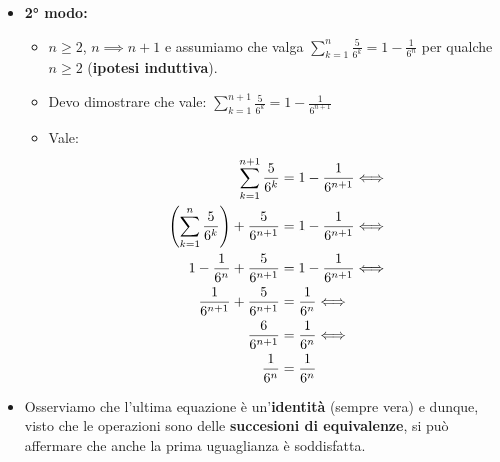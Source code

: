 \documentclass[10pt]{article}
\begin{document}
\begin{itemize}
	\item
	\textbf{2° modo:}
	\begin{itemize}
	\item
	$n \!\geq\! 2$, $n \implies n+1$ e assumiamo che valga $\displaystyle{\sum_{k=1}^{n} \frac{5}{6^k} = 1 - \frac{1}{6^{n}}}$ per qualche $n \geq 2$ (\textbf{ipotesi induttiva}).
	\item
	Devo dimostrare che vale: $\displaystyle{\sum_{k=1}^{n+1} \frac{5}{6^k} = 1 - \frac{1}{6^{n+1}}}$
	\item
	Vale:
	\begin{equation}
	\begin{split}
	\sum_{k=1}^{n+1} \frac{5}{6^k} &= 1 - \frac{1}{6^{n+1}}\Longleftrightarrow \\
	  \left(\sum_{k=1}^{n} \frac{5}{6^k}\right) + \frac{5}{6^{n+1}} &= 1 - \frac{1}{6^{n+1}}\Longleftrightarrow \\
	 1 - \frac{1}{6^n} + \frac{5}{6^{n+1}} &= 1 - \frac{1}{6^{n+1}}\Longleftrightarrow \\
	 \frac{1}{6^{n+1}} + \frac{5}{6^{n+1}} &= \frac{1}{6^{n}}\Longleftrightarrow \\
	 \frac{6}{6^{n+1}} &= \frac{1}{6^{n}}\Longleftrightarrow \\
	 \frac{1}{6^{n}} &= \frac{1}{6^{n}}
	 \notag
	\end{split}
	\end{equation}
	\end{itemize}
	\item
	Osserviamo che l'ultima equazione è un'\textbf{identità} (sempre vera) e dunque, visto che le operazioni sono delle \textbf{succesioni di equivalenze}, si può affermare che anche la prima uguaglianza è soddisfatta.
	\end{itemize}
	
\end{document}
